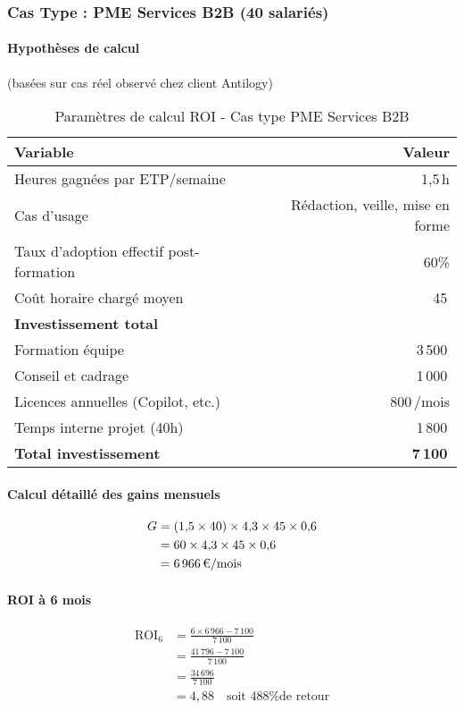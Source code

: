 \subsubsection{Cas Type : PME Services B2B (40 salariés)}

\paragraph{Hypothèses de calcul} (basées sur cas réel observé chez client Antilogy)

\begin{table}[ht]
\centering
\caption{Paramètres de calcul ROI - Cas type PME Services B2B}
\label{tab:roi_parameters}
\begin{tabular}{@{}lr@{}}
\toprule
\textbf{Variable} & \textbf{Valeur} \\
\midrule
Heures gagnées par ETP/semaine & 1{,}5\,h \\
Cas d'usage & Rédaction, veille, mise en forme \\
Taux d'adoption effectif post-formation & 60\% \\
Coût horaire chargé moyen & 45\,\texteuro{} \\
\midrule
\textbf{Investissement total} & \\
Formation équipe & 3\,500\,\texteuro{} \\
Conseil et cadrage & 1\,000\,\texteuro{} \\
Licences annuelles (Copilot, etc.) & 800\,\texteuro{}/mois \\
Temps interne projet (40h) & 1\,800\,\texteuro{} \\
\textbf{Total investissement} & \textbf{7\,100\,\texteuro{}} \\
\bottomrule
\end{tabular}
\end{table}

\paragraph{Calcul détaillé des gains mensuels}
\begin{align}
G &= (1{,}5 \times 40) \times 4{,}3 \times 45 \times 0{,}6 \\
&= 60 \times 4{,}3 \times 45 \times 0{,}6 \\
&= 6\,966\,\text{\texteuro}/\text{mois}
\end{align}

\paragraph{ROI à 6 mois}
\begin{align}
\text{ROI}_6 &= \frac{6 \times 6\,966 - 7\,100}{7\,100} \\
&= \frac{41\,796 - 7\,100}{7\,100} \\
&= \frac{34\,696}{7\,100} \\
&= 4{,}88 \quad \text{soit 488\% de retour}
\end{align}

